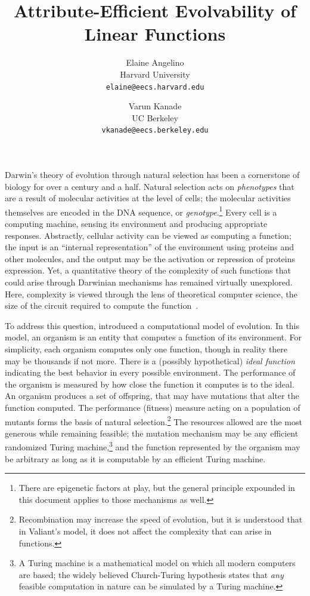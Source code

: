 \documentclass[11pt]{article}
\begin{document}
\title{Attribute-Efficient Evolvability of Linear Functions} 
\author{Elaine Angelino \\
Harvard University \\ \texttt{elaine@eecs.harvard.edu} \and Varun
Kanade \\ UC Berkeley \\ \texttt{vkanade@eecs.berkeley.edu}}

\maketitle

Darwin's theory of evolution through natural selection has been a cornerstone of
biology for over a century and a half.  Natural selection acts on
\emph{phenotypes} that are a result of molecular activities at the level of
cells; the molecular activities themselves are encoded in the DNA sequence, or
\emph{genotype}.\footnote{There are epigenetic factors at play, but the general
principle expounded in this document applies to those mechanisms as well.}
Every cell is a computing machine, sensing its environment and producing
appropriate responses.  Abstractly, cellular activity can be viewed as computing
a function; the input is an ``internal representation'' of the environment using
proteins and other molecules, and the output may be the activation or repression
of proteins expression. Yet, a quantitative theory of the complexity of such
functions that could arise through Darwinian mechanisms has remained virtually
unexplored. Here, complexity is viewed through the lens of theoretical
computer science, \eg the size of the circuit required to compute the
function~\citep{Arora-Barak:textbook, Papadimitriou:textbook}.

To address this question, \citet{Valiant:2009-evolvability} introduced a
computational model of evolution.  In this model, an organism is an entity that
computes a function of its environment. For simplicity, each organism computes
only one function, though in reality there may be
thousands if not more. There is a (possibly hypothetical)
\emph{ideal function} indicating the best behavior in every possible
environment. The performance of the organism is measured by how close the
function it computes is to the ideal. An organism produces a set of offspring,
that may have mutations that  alter the function computed. The performance
(fitness) measure acting on a population of mutants forms the basis of natural
selection.\footnote{Recombination may increase the speed of evolution, but it is
understood that in Valiant's model, it does not affect the complexity that can
arise in functions.} The resources allowed are the most generous while remaining
feasible; the mutation mechanism may be any efficient randomized Turing
machine,\footnote{A Turing machine is a mathematical model on which all modern
computers are based; the widely believed Church-Turing hypothesis states that
\emph{any} feasible computation in nature can be simulated by a Turing
machine.} and the function represented by the organism may be arbitrary as long
as it is computable by an efficient Turing machine.
\end{document}
